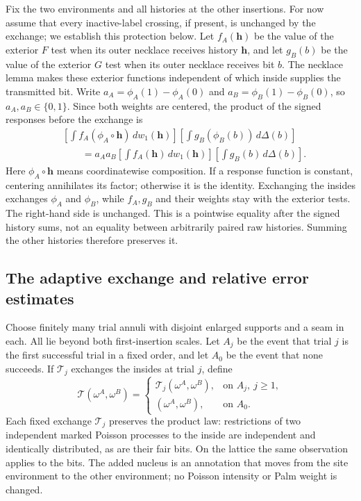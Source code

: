 Fix the two environments and all histories at the other insertions.  For
now assume that every inactive-label crossing, if present, is unchanged
by the exchange; we establish this protection below.  Let $f_A(\mathbf h)$ be the
value of the exterior $F$ test when its outer necklace receives history
$\mathbf h$, and let $g_B(b)$ be the value of the exterior $G$ test when its outer
necklace receives bit $b$.  The necklace lemma makes these exterior
functions independent of which inside supplies the transmitted bit.
Write $a_A=\phi_A(1)-\phi_A(0)$ and
$a_B=\phi_B(1)-\phi_B(0)$, so $a_A,a_B\in\{0,1\}$.  Since both weights
are centered, the product of the signed responses before the exchange is
\begin{equation}
 \begin{aligned}
 &\left[\int f_A(\phi_A\circ\mathbf h)\,dw_1(\mathbf h)\right]
 \left[\int g_B(\phi_B(b))\,d\Delta(b)\right]
 \\
 &\qquad=a_Aa_B\left[\int f_A(\mathbf h)\,dw_1(\mathbf h)\right]
             \left[\int g_B(b)\,d\Delta(b)\right].
 \end{aligned}
 \label{eq:signed-bit-factorization}
\end{equation}
Here $\phi_A\circ\mathbf h$ means coordinatewise composition.  If a response
function is constant, centering annihilates its factor; otherwise it is
the identity.  Exchanging the insides exchanges $\phi_A$ and $\phi_B$,
while $f_A,g_B$ and their weights stay with the exterior tests.  The
right-hand side is unchanged.  This is a pointwise equality after the
signed history sums, not an equality between arbitrarily paired raw
histories.  Summing the other histories therefore preserves it.

\subsection{The adaptive exchange and relative error estimates}

Choose finitely many trial annuli with disjoint enlarged supports and a
seam in each.  All lie beyond both first-insertion scales.  Let $A_j$ be
the event that trial $j$ is the first successful trial in a fixed order,
and let $A_0$ be the event that none succeeds.  If $\mathcal T_j$ exchanges the
insides at trial $j$, define
\[
 \mathcal T(\omega^A,\omega^B)=
 \begin{cases}
 \mathcal T_j(\omega^A,\omega^B),&\text{on }A_j,\ j\ge1,\\
 (\omega^A,\omega^B),&\text{on }A_0.
 \end{cases}
\]
Each fixed exchange $\mathcal T_j$ preserves the product law: restrictions of
two independent marked Poisson processes to the inside are independent
and identically distributed, as are their fair bits.  On the lattice the
same observation applies to the bits.  The added nucleus is an annotation
that moves from the site environment to the other environment; no
Poisson intensity or Palm weight is changed.

